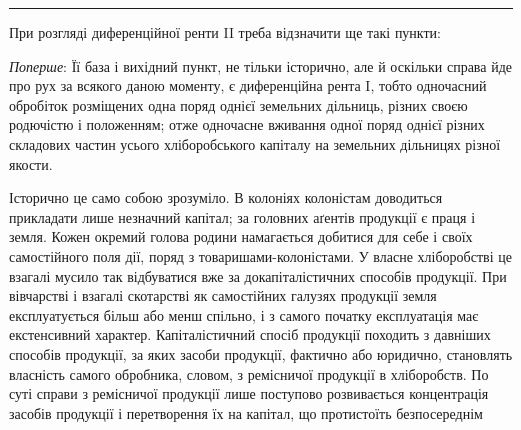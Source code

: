 \plainbreak{3}

При розгляді диференційної ренти II треба відзначити ще такі пункти:

\emph{Поперше}: Її база і вихідний пункт, не тільки історично, але й оскільки
справа йде про рух за всякого даною моменту, є диференційна рента I, тобто
одночасний обробіток розміщених одна поряд однієї земельних дільниць, різних
своєю родючістю і положенням; отже одночасне вживання одної поряд однієї
різних складових частин усього хліборобського капіталу на земельних дільницях
різної якости.

Історично це само собою зрозуміло. В колоніях колоністам доводиться прикладати
лише незначний капітал; за головних аґентів продукції є праця і земля.
Кожен окремий голова родини намагається добитися для себе і своїх самостійного
поля дії, поряд з товаришами-колоністами. У власне хліборобстві це
взагалі мусило так відбуватися вже за докапіталістичних способів продукції. При
вівчарстві і взагалі скотарстві як самостійних галузях продукції земля експлуатується
більш або менш спільно, і з самого початку експлуатація має екстенсивний
характер. Капіталістичний спосіб продукції походить з давніших способів
продукції, за яких засоби продукції, фактично або юридично, становлять
власність самого обробника, словом, з ремісничої продукції в хліборобств. По
суті справи з ремісничої продукції лише поступово розвивається концентрація
засобів продукції і перетворення їх на капітал, що протистоїть безпосереднім
\parbreak{}  %
